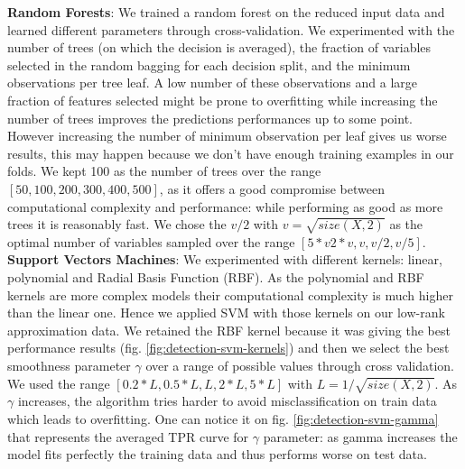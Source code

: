 \documentclass[10pt,a4paper]{article}
\begin{document}
    \textbf{Random Forests}: We trained a random forest on the reduced input data and learned different parameters through cross-validation. We experimented with the number of trees (on which the decision is averaged), the fraction of variables selected in the random bagging for each decision split, and the minimum observations per tree leaf. A low number of these observations and a large fraction of features selected might be prone to overfitting while increasing the number of trees improves the predictions performances up to some point. However increasing the number of minimum observation per leaf gives us worse results, this may happen because we don't have enough training examples in our folds. We kept 100 as the number of trees over the range $[50, 100, 200, 300, 400, 500]$, as it offers a good compromise between computational complexity and performance:  while performing as good as more trees it is reasonably fast. We chose the $v/ 2$ with $v = \sqrt{size(X,2)}$ as the optimal number of variables sampled over the range $[5*v 2*v, v, v/ 2, v/ 5]$.\\

  \textbf{Support Vectors Machines}: We experimented with different kernels: linear, polynomial and Radial Basis Function (RBF). As the polynomial and RBF kernels are more complex models their computational complexity is much higher than the linear one. Hence we applied SVM with those kernels on our low-rank approximation data. We retained the RBF kernel because it was giving the best performance results (fig. \ref{fig:detection-svm-kernels}) and then we select the best smoothness parameter $\gamma$ over a range of possible values through cross validation. We used the range $[0.2*L, 0.5*L, L, 2*L, 5*L]$ with $L = 1 / \sqrt{size(X,2)}$. As $\gamma$ increases, the algorithm tries harder to avoid misclassification on train data which leads to overfitting. One can notice it on fig. \ref{fig:detection-svm-gamma} that represents the averaged TPR curve for $\gamma$ parameter: as gamma increases the model fits perfectly the training data and thus performs worse on test data.\\
\end{document}
